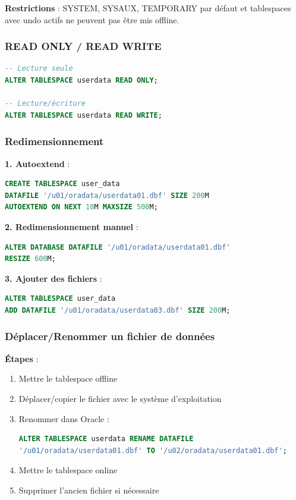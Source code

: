 \documentclass[12pt,a4paper]{article}
\begin{document}
\textbf{Restrictions} : SYSTEM, SYSAUX, TEMPORARY par défaut et tablespaces avec undo actifs ne peuvent pas être mis offline.

\subsubsection{READ ONLY / READ WRITE}

\begin{lstlisting}[language=SQL]
-- Lecture seule
ALTER TABLESPACE userdata READ ONLY;

-- Lecture/écriture
ALTER TABLESPACE userdata READ WRITE;
\end{lstlisting}

\subsubsection{Redimensionnement}

\textbf{1. Autoextend} :
\begin{lstlisting}[language=SQL]
CREATE TABLESPACE user_data
DATAFILE '/u01/oradata/userdata01.dbf' SIZE 200M
AUTOEXTEND ON NEXT 10M MAXSIZE 500M;
\end{lstlisting}

\textbf{2. Redimensionnement manuel} :
\begin{lstlisting}[language=SQL]
ALTER DATABASE DATAFILE '/u01/oradata/userdata01.dbf' 
RESIZE 600M;
\end{lstlisting}

\textbf{3. Ajouter des fichiers} :
\begin{lstlisting}[language=SQL]
ALTER TABLESPACE user_data
ADD DATAFILE '/u01/oradata/userdata03.dbf' SIZE 200M;
\end{lstlisting}

\subsubsection{Déplacer/Renommer un fichier de données}

\textbf{Étapes} :
\begin{enumerate}
    \item Mettre le tablespace offline
    \item Déplacer/copier le fichier avec le système d'exploitation
    \item Renommer dans Oracle :
    \begin{lstlisting}[language=SQL]
ALTER TABLESPACE userdata RENAME DATAFILE 
'/u01/oradata/userdata01.dbf' TO '/u02/oradata/userdata01.dbf';
    \end{lstlisting}
    \item Mettre le tablespace online
    \item Supprimer l'ancien fichier si nécessaire
\end{enumerate}
\end{document}
